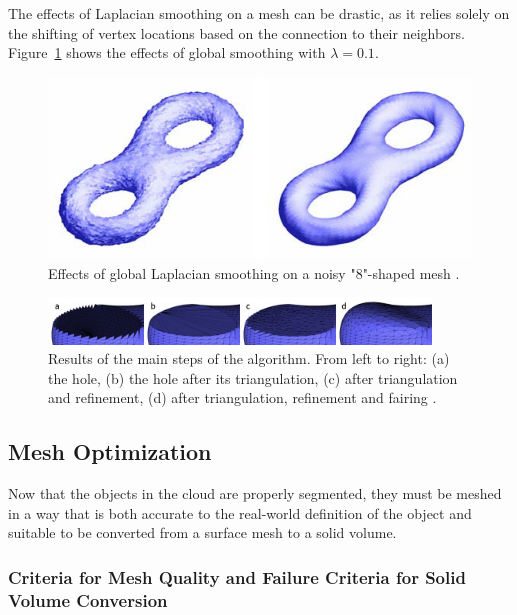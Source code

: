 \documentclass[12pt]{drexelthesis}
\let\Oldsubsection\subsection
\renewcommand{\subsection}{\FloatBarrier\Oldsubsection}
\let\Oldsubsubsection\subsubsection
\renewcommand{\subsubsection}{\FloatBarrier\Oldsubsubsection}
\begin{document}
The effects of Laplacian smoothing on a mesh can be drastic, as it relies solely on the shifting of vertex locations based on the connection to their neighbors. Figure~\ref{lapsmoothing} shows the effects of global smoothing with $\lambda=0.1$.

\begin{figure}[!ht]
	\centering
	\includegraphics{holefilling/laplaciansmoothinglamdaonetenth.png}
	\caption[Effects of global Laplacian smoothing with $\lambda=0.1$]{\centering Effects of global Laplacian smoothing on a noisy "8"-shaped mesh \cite{laplacianimage}.}
	\label{lapsmoothing}
\end{figure}



\begin{figure}[!ht]
	\centering
	\includegraphics[width=4in]{hole_fill.jpg}
	\caption[visualization of hole filling, refinement, and fairing]{Results of the main steps of the algorithm. From left to right: (a) the hole, (b) the hole after its triangulation, (c) after triangulation and refinement, (d) after triangulation, refinement and fairing \cite{meshprocessing}.}
\end{figure}

\subsection{Mesh Optimization}
\label{subsec:meshoptimization}
Now that the objects in the cloud are properly segmented, they must be meshed in a way that is both accurate to the real-world definition of the object and suitable to be converted from a surface mesh to a solid volume.

\subsubsection{Criteria for Mesh Quality and Failure Criteria for Solid Volume Conversion}
\end{document}
